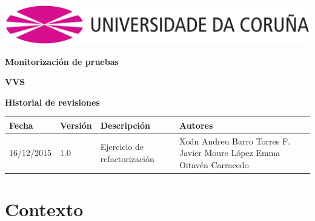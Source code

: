 \documentclass[12pt, a4paper, titlepage]{article}
\begin{document}
	
	
	\begin{titlepage}
		
		\includegraphics[width=15cm]{Imagenes/Simbolo_logo_UDC.png}
		
		\vspace{6cm}
		
		\begin{flushright}
			
			\LARGE{\textbf{Monitorización de pruebas}}
			
			\large{\textbf{VVS}}
		\end{flushright}
		
		\vspace{3cm}
		\begin{center}
			\large{\textbf{Historial de revisiones}}
			
			\begin{tabular}{ | p{3cm} | p{2cm} | p{4cm} | p{6cm} |}
				\hline
				\textbf{Fecha} & \textbf{Versión} & \textbf{Descripción} & \textbf{Autores} \\ \hline
				16/12/2015 &  1.0 &  Ejercicio de refactorización & Xoán Andreu Barro Torres \newline F. Javier Moure López \newline Emma Oitavén Carracedo \\ \hline
			\end{tabular}
		\end{center}
		
	\end{titlepage}
	\clearpage
	
	
	\tableofcontents
	\newpage
	
	\section{Contexto}
	
\end{document}
